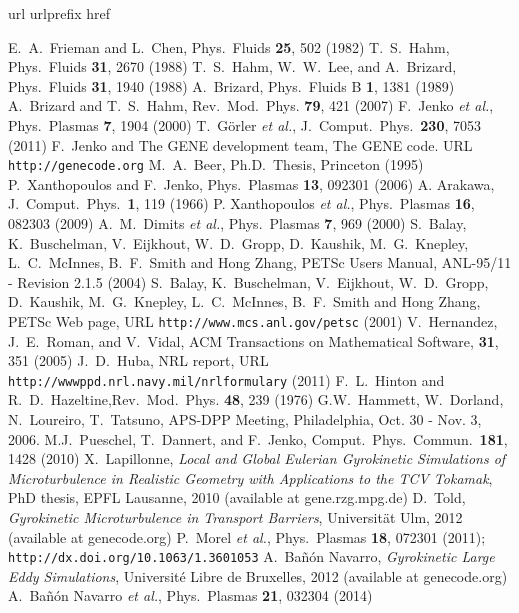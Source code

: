 \documentclass[12pt]{article}
\begin{document}
%
\begin{thebibliography}{99}
\expandafter\ifx\csname url\endcsname\relax
  \def\url#1{\texttt{#1}}\fi
\expandafter\ifx\csname urlprefix\endcsname\relax\def\urlprefix{URL }\fi
\expandafter\ifx\csname href\endcsname\relax
  \def\href#1#2{#2} \def\path#1{#1}\fi

 E.~A.~Frieman and L.~Chen, Phys.~Fluids \textbf{25}, 502 (1982)
 T.~S.~Hahm, Phys.~Fluids \textbf{31}, 2670 (1988)
 T.~S.~Hahm, W.~W.~Lee, and A.~Brizard, Phys.~Fluids \textbf{31}, 1940 (1988)
 A.~Brizard, Phys.~Fluids B \textbf{1}, 1381 (1989)
 A.~Brizard and T.~S.~Hahm, Rev.~Mod.~Phys. \textbf{79}, 421 (2007)
 F.~Jenko {\em et al.}, Phys.~Plasmas \textbf{7}, 1904 (2000)
 T.~G\"orler {\em et al.}, J.~Comput.~Phys.~\textbf{230}, 7053 (2011)
 F.~{Jenko} and {The GENE development team}, \href{http://genecode.org}{The
  {GENE} code}.
\newline\urlprefix\url{http://genecode.org}
 M.~A.~Beer, Ph.D.~Thesis, Princeton (1995)
 P.~Xanthopoulos and F.~Jenko, Phys.~Plasmas \textbf{13}, 092301 (2006)
 A. Arakawa, J.~Comput.~Phys.~\textbf{1}, 119 (1966)
 P. Xanthopoulos {\em et al.}, Phys.~Plasmas \textbf{16}, 082303 (2009)
 A.~M.~Dimits {\em et al.}, Phys.~Plasmas \textbf{7}, 969 (2000)
 S.~Balay, K.~Buschelman, V.~Eijkhout, W.~D.~Gropp, D.~Kaushik,
  M.~G.~Knepley, L.~C.~McInnes, B.~F.~Smith and Hong Zhang, PETSc Users Manual,
  ANL-95/11 - Revision 2.1.5 (2004)
 S.~Balay, K.~Buschelman, V.~Eijkhout, W.~D.~Gropp, D.~Kaushik,
  M.~G.~Knepley, L.~C.~McInnes, B.~F.~Smith and Hong Zhang, PETSc Web page,
  \urlprefix\url{http://www.mcs.anl.gov/petsc} (2001)
 V.~Hernandez, J.~E.~Roman, and V.~Vidal, ACM Transactions on
  Mathematical Software, \textbf{31}, 351 (2005)
 J.~D.~Huba, NRL report, \urlprefix\url{http://wwwppd.nrl.navy.mil/nrlformulary} (2011)
 F.~L.~Hinton and R.~D.~Hazeltine,Rev.~Mod.~Phys. \textbf{48}, 239 (1976)
 G.W.~Hammett, W.~Dorland, N.~Loureiro, T.~Tatsuno, APS-DPP Meeting, Philadelphia, Oct. 30 - Nov. 3, 2006.
 M.J.~Pueschel, T.~Dannert, and F.~Jenko,
Comput.~Phys.~Commun.~\textbf{181}, 1428 (2010)
 X.~Lapillonne, {\em Local and Global Eulerian Gyrokinetic Simulations of Microturbulence in Realistic Geometry with Applications to the TCV Tokamak}, PhD thesis, EPFL Lausanne, 2010 (available at gene.rzg.mpg.de)
 D.~Told, {\em Gyrokinetic Microturbulence in Transport Barriers}, Universit\"at Ulm, 2012 (available at genecode.org)
 P.~Morel {\em et al.}, Phys.~Plasmas \textbf{18}, 072301 (2011); \url{http://dx.doi.org/10.1063/1.3601053}
 A.~Ba\~{n}{\'o}n Navarro, {\em Gyrokinetic Large Eddy Simulations}, Universit\'e Libre de Bruxelles, 2012 (available at genecode.org)
 A.~Ba\~{n}{\'o}n Navarro {\em et al.}, Phys.~Plasmas {\bf 21}, 032304 (2014)
\end{thebibliography}
\end{document}
